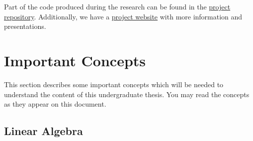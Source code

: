 \documentclass{article}
\begin{document}
	Part of the code produced during the research can be found in the \href{https://github.com/decoNR/Bepe-University-of-Massachusetts}{project repository}. Additionally, we have a \href{https://interscity.org/quantum-internet/}{project website} with more information and presentations.


\newpage

\section{Important Concepts}
	This section describes some important concepts which will be needed to understand the content of this undergraduate thesis. You may read the concepts as they appear on this document.

	\subsection{Linear Algebra}
\end{document}
